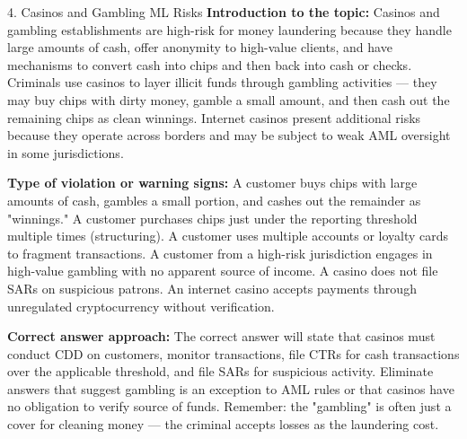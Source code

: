 \documentclass[11pt,a4paper]{beamer}
\begin{document}
\begin{frame}{4. Casinos and Gambling ML Risks}
\tiny
\noindent\textbf{Introduction to the topic:} Casinos and gambling establishments are high-risk for money laundering because they handle large amounts of cash, offer anonymity to high-value clients, and have mechanisms to convert cash into chips and then back into cash or checks. Criminals use casinos to layer illicit funds through gambling activities — they may buy chips with dirty money, gamble a small amount, and then cash out the remaining chips as clean winnings. Internet casinos present additional risks because they operate across borders and may be subject to weak AML oversight in some jurisdictions.

\vspace{0.1cm}
\noindent\textbf{Type of violation or warning signs:} A customer buys chips with large amounts of cash, gambles a small portion, and cashes out the remainder as "winnings." A customer purchases chips just under the reporting threshold multiple times (structuring). A customer uses multiple accounts or loyalty cards to fragment transactions. A customer from a high-risk jurisdiction engages in high-value gambling with no apparent source of income. A casino does not file SARs on suspicious patrons. An internet casino accepts payments through unregulated cryptocurrency without verification.

\vspace{0.1cm}
\noindent\textbf{Correct answer approach:} The correct answer will state that casinos must conduct CDD on customers, monitor transactions, file CTRs for cash transactions over the applicable threshold, and file SARs for suspicious activity. Eliminate answers that suggest gambling is an exception to AML rules or that casinos have no obligation to verify source of funds. Remember: the "gambling" is often just a cover for cleaning money — the criminal accepts losses as the laundering cost.
\end{frame}
\end{document}
